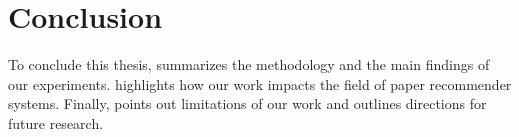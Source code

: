 \chapter{Conclusion} \label{sec:conclusion}

To conclude this thesis,  summarizes the methodology and the main findings of our experiments.  highlights how our work impacts the field of paper recommender systems. Finally,  points out limitations of our work and outlines directions for future research.
